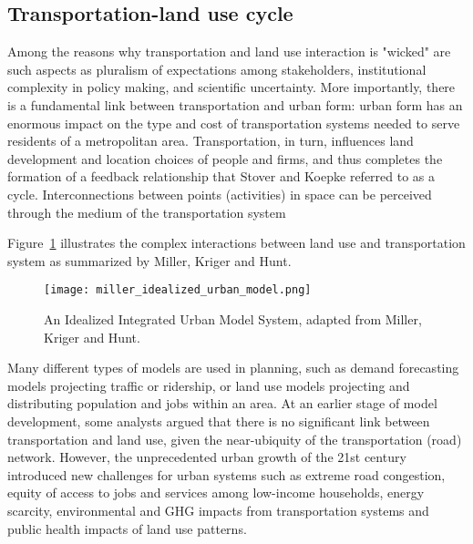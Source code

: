 \subsection{Transportation-land use cycle} \label{subsec:transportation_land_use_cycle}

Among the reasons why transportation and land use interaction is "wicked" are such aspects as pluralism of expectations among stakeholders, institutional complexity in policy making, and scientific uncertainty\cite{Noto2015}.
More importantly, there is a fundamental link between transportation and urban form: urban form has an enormous impact on the type and cost of transportation systems needed to serve residents of a metropolitan area\cite{Kelly1994}.
Transportation, in turn, influences land development and location choices of people and firms, and thus completes the formation of a feedback relationship that Stover and Koepke\cite{Stover1988} referred to as a cycle.
Interconnections between points (activities) in space can be perceived through the medium of the transportation system\cite{Miller1998}

Figure~\ref{fig:idealized_integrated_urban_model} illustrates the complex interactions between land use and transportation system as summarized by Miller, Kriger and Hunt\cite{Miller1998}.

\begin{figure}[hbt!]
    \centering
    \texttt{[image: miller\_idealized\_urban\_model.png]}
    \caption{An Idealized Integrated Urban Model System, adapted from Miller, Kriger and Hunt\cite{Miller1998}.}
    \label{fig:idealized_integrated_urban_model}
\end{figure}

Many different types of models are used in planning, such as demand forecasting models projecting traffic or ridership, or land use models projecting and distributing population and jobs within an area.
At an earlier stage of model development, some analysts argued that there is no significant link between transportation and land use, given the near-ubiquity of the transportation (road) network\cite{Miller1998}.
However, the unprecedented urban growth of the 21st century introduced new challenges for urban systems such as extreme road congestion, equity of access to jobs and services among low-income households, energy scarcity, environmental and GHG impacts from transportation systems and public health impacts of land use patterns\cite{Miller2018b,Moeckel2017}.

